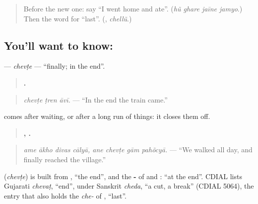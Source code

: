 \label{lesson:GU-C276-chevte}



\begin{quote}
Before the new one: say \textquotedblleft{}I went home and ate\textquotedblright{}. (\emph{hũ ghare jaīne jamyo}.) Then the word for \textquotedblleft{}last\textquotedblright{}. (\textbf{}, \emph{chellũ}.)
\end{quote}

\subsection*{You'll want to know: }
\textbf{} — \emph{chevṭe} — \textquotedblleft{}finally; in the end\textquotedblright{}.

\begin{quote}
\textbf{  .}
\end{quote}

\begin{quote}
\emph{chevṭe ṭren āvī.} — \textquotedblleft{}In the end the train came.\textquotedblright{}
\end{quote}

\textbf{} comes after waiting, or after a long run of things: it closes them off.

\begin{quote}
\textbf{   ,    .}
\end{quote}

\begin{quote}
\emph{ame ākho divas cālyā, ane chevṭe gām pahõcyā.} — \textquotedblleft{}We walked all day, and finally reached the village.\textquotedblright{}
\end{quote}

\begin{cousinweb}
\textbf{} (\emph{chevṭe}) is built from \textbf{}, \textquotedblleft{}the end\textquotedblright{}, and the \textbf{-} of \textbf{} and \textbf{}: \textquotedblleft{}at the end\textquotedblright{}. CDIAL lists Gujarati \emph{chevaṭ}, \textquotedblleft{}end\textquotedblright{}, under Sanskrit \emph{cheda}, \textquotedblleft{}a cut, a break\textquotedblright{} (CDIAL 5064), the entry that also holds the \emph{che-} of \textbf{}, \textquotedblleft{}last\textquotedblright{}.
\end{cousinweb}

